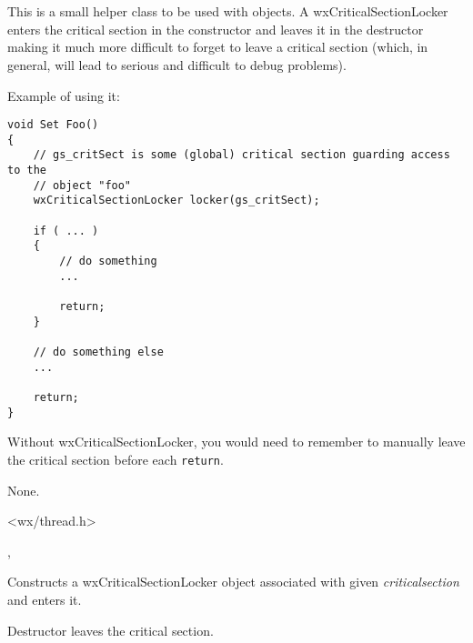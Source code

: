 \section{}\label{wxcriticalsectionlocker}

This is a small helper class to be used with  
objects. A wxCriticalSectionLocker enters the critical section in the
constructor and leaves it in the destructor making it much more difficult to
forget to leave a critical section (which, in general, will lead to serious
and difficult to debug problems).

Example of using it:

\begin{verbatim}
void Set Foo()
{
    // gs_critSect is some (global) critical section guarding access to the
    // object "foo"
    wxCriticalSectionLocker locker(gs_critSect);

    if ( ... )
    {
        // do something
        ...

        return;
    }

    // do something else
    ...

    return;
}
\end{verbatim}

Without wxCriticalSectionLocker, you would need to remember to manually leave
the critical section before each {\tt return}.


None.


<wx/thread.h>




, 


\label{wxcriticalsectionlockerctor}


Constructs a wxCriticalSectionLocker object associated with given
{\it criticalsection} and enters it.

\label{wxcriticalsectionlockerdtor}


Destructor leaves the critical section.

